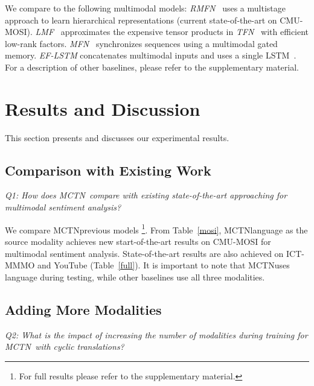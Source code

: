 \documentclass[letterpaper]{article} %
\newcommand{\citep}{\cite}
\newcommand{\ours}{MCTN}
\begin{document}
We compare to the following multimodal models: \textit{RMFN}~\citep{multistage} uses a multistage approach to learn hierarchical representations (current state-of-the-art on CMU-MOSI). \textit{LMF}~\citep{lowrank} approximates the expensive tensor products in \textit{TFN}~\citep{tensoremnlp17} with efficient low-rank factors. \textit{MFN}~\citep{zadeh2018memory} synchronizes sequences using a multimodal gated memory. \textit{EF-LSTM} concatenates multimodal inputs and uses a single LSTM~\citep{Hochreiter:1997:LSM:1246443.1246450}. For a description of other baselines, please refer to the supplementary material.

\section{Results and Discussion} \label{sec:Results}

This section presents and discusses our experimental results.

\subsection{Comparison with Existing Work}

\textit{Q1: 
How does \ours \ compare with existing state-of-the-art approaching for multimodal sentiment analysis?}

We compare \ours \with  previous models \footnote{For full results please refer to the supplementary material.}. From Table~\ref{mosi}, \ours \using language as the source modality achieves new start-of-the-art results on CMU-MOSI for multimodal sentiment analysis. State-of-the-art results are also achieved on ICT-MMMO and YouTube (Table~\ref{full}). It is important to note that \ours \only uses language during testing, while other baselines use all three modalities.

\subsection{Adding More Modalities}

\textit{Q2: What is the impact of increasing the number of modalities during training for \ours \ with cyclic translations?}
\end{document}
